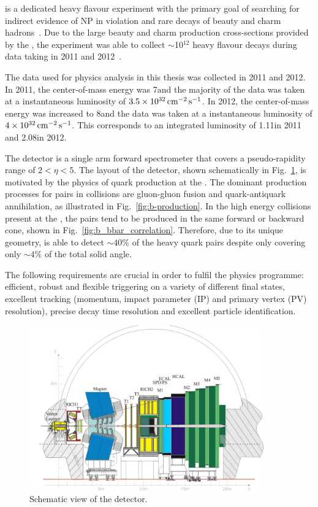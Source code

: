 \lhcb is a dedicated heavy flavour experiment with the primary goal of searching for indirect evidence of NP in \CP violation and rare decays of beauty and charm hadrons~\cite{lhcb}. Due to the large beauty and charm production cross-sections provided by the \lhc, the \lhcb experiment was able to collect $\sim$10$^{12}$ heavy flavour decays during data taking in 2011 and 2012~\cite{LHCb-DP-2014-002}.

The data used for physics analysis in this thesis was collected in 2011 and 2012. In 2011, the center-of-mass energy was 7\tev and the majority of the data was taken at a instantaneous luminosity of $3.5\times10^{32}\mathrm{ \,cm}^{-2}\mathrm{{\,s}}^{-1}$. In 2012, the center-of-mass energy was increased to 8\tev and the data was taken at a instantaneous luminosity of $4\times10^{32}\mathrm{ \,cm}^{-2}\mathrm{{\,s}}^{-1}$. This corresponds to an integrated luminosity of 1.11\invfb in 2011 and 2.08\invfb in 2012.

The \lhcb detector is a single arm forward spectrometer that covers a pseudo-rapidity range of $2 < \eta < 5$. The layout of the \lhcb detector, shown schematically in Fig.~\ref{fig:lhcb-run1}, is motivated by the physics of \bquark quark production at the \lhc. The dominant production processes for \bquark\bquarkbar pairs in \proton\proton collisions are gluon-gluon fusion and quark-antiquark annihilation, as illustrated in Fig.~\ref{fig:b-production}. In the high energy collisions present at the \lhc, the \bquark\bquarkbar pairs tend to be produced in the same forward or backward cone, shown in Fig.~\ref{fig:b_bbar_correlation}.  Therefore, due to its unique geometry, \lhcb is able to detect $\sim40\%$ of the heavy quark pairs despite only covering only $\sim4\%$ of the total solid angle.

The following requirements are crucial in order to fulfil the \lhcb physics programme: efficient, robust and flexible triggering on a variety of different final states, excellent tracking (momentum, impact parameter (IP) and primary vertex (PV) resolution), precise decay time resolution and excellent particle identification.

\begin{figure}
\centering
\includegraphics[width=0.9\textwidth]{figs/detector/lhcb-run1.pdf}
\caption{Schematic view of the \lhcb detector.}
\label{fig:lhcb-run1}
\end{figure}

